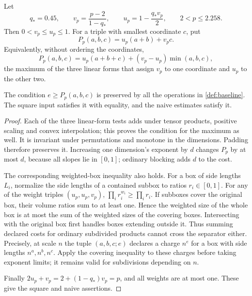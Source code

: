 Let
\begin{equation}\label{eq:plane-parameters}
 q_*=0.45,\qquad
 v_p=\frac{p-2}{1-q_*},\qquad
 u_p=1-\frac{q_*v_p}{2},\qquad 2<p\le2.258.
\end{equation}
Then \(0<v_p\le u_p\le1\).
For a triple with smallest coordinate \(c\), put
\begin{equation}\label{eq:plane}
 P_p(a,b,c)=u_p(a+b)+v_pc.
\end{equation}
Equivalently, without ordering the coordinates,
\[
 P_p(a,b,c)
 =u_p(a+b+c)+(v_p-u_p)\min(a,b,c),
\]
the maximum of the three linear forms that assign \(v_p\) to one
coordinate and \(u_p\) to the other two.

\begin{lemma}\label{lem:plane-preservation}
The condition \(e\ge P_p(a,b,c)\) is preserved by all the operations
in \cref{def:baseline}.  The square input satisfies it with equality,
and the naive estimates satisfy it.
\end{lemma}

\begin{proof}
Each of the three linear-form tests adds under tensor products,
positive scaling and convex interpolation; this proves the condition
for the maximum as well.
It is invariant under permutations and monotone in the dimensions.
Padding therefore preserves it.
Increasing one dimension's exponent by \(d\) changes \(P_p\) by at
most \(d\), because all slopes lie in \([0,1]\); ordinary blocking
adds \(d\) to the cost.

The corresponding weighted-box inequality also holds.
For a box of side lengths \(L_i\), normalize the side lengths of a
contained subbox to ratios \(r_i\in[0,1]\).
For any of the weight triples \((u_p,u_p,v_p)\),
\(\prod_i r_i^{w_i}\ge\prod_i r_i\).
If subboxes cover the original box, their volume ratios sum to at
least one.  Hence the weighted size of the whole box is at most
the sum of the weighted sizes of the covering boxes.
Intersecting with the original box first handles boxes extending
outside it.
Thus summing declared costs for ordinary subdivided products cannot
cross the separator either.
Precisely, at scale \(n\) the tuple \((a,b,c;e)\) declares a charge
\(n^e\) for a box with side lengths \(n^a,n^b,n^c\).
Apply the covering inequality to these charges before taking exponent
limits; it remains valid for subdivisions depending on \(n\).

Finally
\(2u_p+v_p=2+(1-q_*)v_p=p\), and all weights are at most one.
These give the square and naive assertions.
\end{proof}

